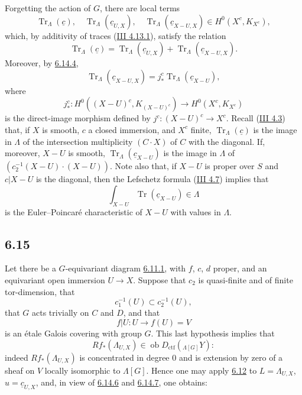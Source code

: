 \documentclass[11pt]{article}
\providecommand{\Tr}{\operatorname{Tr}}
\providecommand{\Tr}{\operatorname{Tr}}
\providecommand{\Ob}{\operatorname{ob}}
\providecommand{\Tr}{\operatorname{Tr}}
\providecommand{\Ob}{\operatorname{ob}}
\providecommand{\Tr}{\operatorname{Tr}}
\providecommand{\Ob}{\operatorname{Ob}}
\providecommand{\Tr}{\operatorname{Tr}}
\providecommand{\Ob}{\operatorname{ob}}
\providecommand{\Ob}{\operatorname{Ob}}
\begin{document}
Forgetting the action of $G$, there are local terms
\begin{equation}
\Tr_{\Lambda}(\underline c),\quad
\Tr_{\Lambda}(\underline c_{U,X}),\quad
\Tr_{\Lambda}(\underline c_{X-U,X})
\in H^0(X^c,K_{X^c}),
\tag{6.14.5}\label{sga5:IIIB:equation:6.14.5}
\end{equation}
which, by additivity of traces (\hyperref[sga5:III:equation:4.13.1]{III 4.13.1}), satisfy the relation
\begin{equation}
\Tr_{\Lambda}(\underline c)
=
\Tr_{\Lambda}(\underline c_{U,X})
+
\Tr_{\Lambda}(\underline c_{X-U,X}).
\tag{6.14.6}\label{sga5:IIIB:equation:6.14.6}
\end{equation}
Moreover, by \hyperref[sga5:IIIB:equation:6.14.4]{6.14.4},
\begin{equation}
\Tr_{\Lambda}(\underline c_{X-U,X})
=
j_*^c\Tr_{\Lambda}(\underline c_{X-U}),
\tag{6.14.7}\label{sga5:IIIB:equation:6.14.7}
\end{equation}
where
\[
j_*^c:H^0((X-U)^c,K_{(X-U)^c})\longrightarrow H^0(X^c,K_{X^c})
\]
is the direct-image morphism defined by $j^c:(X-U)^c\to X^c$. Recall (\hyperref[sga5:III:example:4.3]{III 4.3}) that, if $X$ is smooth, $c$ a closed immersion, and $X^c$ finite, $\Tr_{\Lambda}(\underline c)$ is the image in $\Lambda$ of the intersection multiplicity $(C\cdot X)$ of $C$ with the diagonal. If, moreover, $X-U$ is smooth, $\Tr_{\Lambda}(\underline c_{X-U})$ is the image in $\Lambda$ of $(c_2^{-1}(X-U)\cdot(X-U))$. Note also that, if $X-U$ is proper over $S$ and $c|X-U$ is the diagonal, then the Lefschetz formula (\hyperref[sga5:III:corollary:4.7]{III 4.7}) implies that
\[
\int_{X-U}\Tr(\underline c_{X-U})\in\Lambda
\]
is the Euler--Poincaré characteristic of $X-U$ with values in $\Lambda$.

\subsection*{6.15}\label{sga5:IIIB:subsection:6.15}
Let there be a $G$-equivariant diagram \hyperref[sga5:IIIB:equation:6.11.1]{6.11.1}, with $f$, $c$, $d$ proper, and an equivariant open immersion $U\to X$. Suppose that $c_2$ is quasi-finite and of finite tor-dimension, that
\[
c_1^{-1}(U)\subset c_2^{-1}(U),
\]
that $G$ acts trivially on $C$ and $D$, and that
\[
f|U:U\longrightarrow f(U)=V
\]
is an étale Galois covering with group $G$. This last hypothesis implies that
\[
Rf_*(\Lambda_{U,X})\in\Ob D_{\mathrm{ctf}}({}_{\Lambda[G]}Y):
\]
indeed $Rf_*(\Lambda_{U,X})$ is concentrated in degree $0$ and is extension by zero of a sheaf on $V$ locally isomorphic to $\Lambda[G]$. Hence one may apply \hyperref[sga5:IIIB:proposition:6.12]{6.12} to $L=\Lambda_{U,X}$, $u=\underline c_{U,X}$, and, in view of \hyperref[sga5:IIIB:equation:6.14.6]{6.14.6} and \hyperref[sga5:IIIB:equation:6.14.7]{6.14.7}, one obtains:
\end{document}
